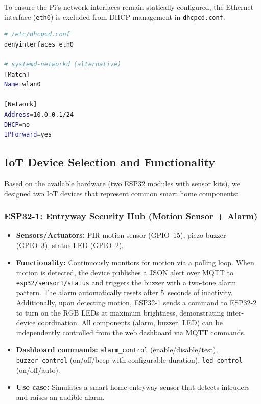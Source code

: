\documentclass[12pt,a4paper]{article}
\begin{document}
To ensure the Pi's network interfaces remain statically configured, the Ethernet interface (\texttt{eth0}) is excluded from DHCP management in \texttt{dhcpcd.conf}:

\begin{lstlisting}[language=bash,frame=none,backgroundcolor=\color{white}]
# /etc/dhcpcd.conf
denyinterfaces eth0

# systemd-networkd (alternative)
[Match]
Name=wlan0

[Network]
Address=10.0.0.1/24
DHCP=no
IPForward=yes
\end{lstlisting}

\subsection{IoT Device Selection and Functionality}
\label{sec:devices}

Based on the available hardware (two ESP32 modules with sensor kits), we designed two IoT devices that represent common smart home components:

\subsubsection*{ESP32-1: Entryway Security Hub (Motion Sensor + Alarm)}
\begin{itemize}
    \item \textbf{Sensors/Actuators:} PIR motion sensor (GPIO~15), piezo buzzer (GPIO~3), status LED (GPIO~2).
    \item \textbf{Functionality:} Continuously monitors for motion via a polling loop. When motion is detected, the device publishes a JSON alert over MQTT to \texttt{esp32/sensor1/status} and triggers the buzzer with a two-tone alarm pattern. The alarm automatically resets after 5~seconds of inactivity. Additionally, upon detecting motion, ESP32-1 sends a command to ESP32-2 to turn on the RGB LEDs at maximum brightness, demonstrating inter-device coordination. All components (alarm, buzzer, LED) can be independently controlled from the web dashboard via MQTT commands.
    \item \textbf{Dashboard commands:} \texttt{alarm\_control} (enable/disable/test), \texttt{buzzer\_control} (on/off/beep with configurable duration), \texttt{led\_control} (on/off/auto).
    \item \textbf{Use case:} Simulates a smart home entryway sensor that detects intruders and raises an audible alarm.
\end{itemize}
\end{document}
